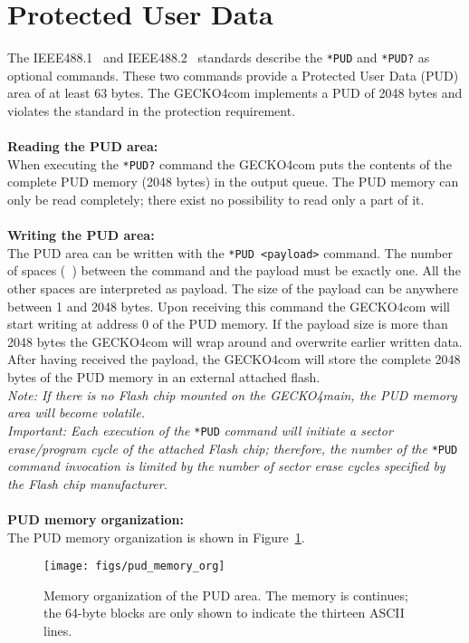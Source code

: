 \section{Protected User Data}
\label{sec: PUD}
The IEEE488.1~\cite{ieee488_1} and IEEE488.2~\cite{ieee488_2} standards describe
the \verb+*PUD+ and \verb+*PUD?+ as optional commands. These two commands
provide a Protected User Data (PUD) area of at least 63 bytes. The {\sc GECKO4com}
implements a PUD of 2048 bytes and violates the standard in the protection
requirement.\\
 \\
\textbf{Reading the PUD area:}\\
When executing the \verb+*PUD?+ command the {\sc GECKO4com} puts the contents of
the complete PUD memory (2048 bytes) in the output queue. The PUD memory can
only be read completely; there exist no possibility to read only a part of it.\\
 \\
\textbf{Writing the PUD area:}\\
The PUD area can be written with the \verb*+*PUD <payload>+ command. The number
of spaces (\verb*+ +) between the command and the payload must be exactly
one. All the other spaces are interpreted as payload. The size of
the payload can be anywhere between 1 and 2048 bytes. Upon receiving this
command the {\sc GECKO4com} will start writing at address 0 of the PUD memory.
If the payload size is more than 2048 bytes the {\sc GECKO4com} will wrap around
and overwrite earlier written data. After having received the payload, the {\sc
GECKO4com} will store the complete 2048 bytes of the PUD memory in an external
attached flash.\\
\textit{Note:  If there is no Flash chip mounted on the {\sc GECKO4main}, the
PUD memory area will become volatile.\note}\\
\textit{Important: Each execution of the} \verb+*PUD+ \textit{command will initiate a
sector erase/program cycle of the attached Flash chip; therefore, the number of 
the} \verb+*PUD+ \textit{command invocation is limited by the number of 
sector erase cycles specified by the Flash chip manufacturer.\important}\\
 \\
\textbf{PUD memory organization:}\\
The PUD memory organization is shown in Figure~\ref{fig:PUD mem org}.
\begin{figure}
\centering%
\texttt{[image: figs/pud\_memory\_org]}
\caption{Memory organization of the PUD area. The memory is continues; the
64-byte blocks are only shown to indicate the thirteen ASCII lines.}
\label{fig:PUD mem org}
\end{figure}
